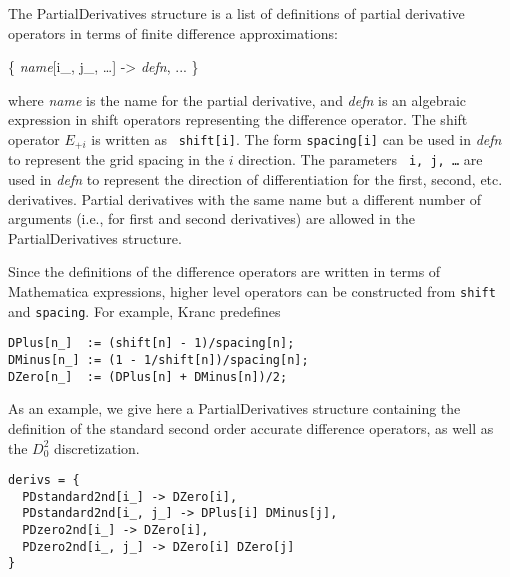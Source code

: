 \documentclass{report}
\begin{document}
The PartialDerivatives structure is a list of definitions of partial
derivative operators in terms of finite difference approximations:

\begin{center}
\begin{minipage}{0.8 \textwidth}
\begin{tt}
\{  {\it name}[i\_, j\_, \ldots] -> {\it defn}, ...  \}
\end{tt}
\end{minipage}
\end{center}

where {\it name} is the name for the partial derivative, and {\it
defn} is an algebraic expression in shift operators representing the
difference operator.  The shift operator $E_{+i}$ is written as {\tt
shift[i]}.  The form {\tt spacing[i]} can be used in {\it defn} to
represent the grid spacing in the $i$ direction.  The parameters {\tt
i, j, \ldots} are used in {\it defn} to represent the direction of
differentiation for the first, second, etc.  derivatives.  Partial
derivatives with the same name but a different number of arguments
(i.e., for first and second derivatives) are allowed in the
PartialDerivatives structure.

Since the definitions of the difference operators are written in terms
of Mathematica expressions, higher level operators can be constructed
from {\tt shift} and {\tt spacing}.  For example, Kranc predefines

\begin{center}
\begin{minipage}{0.8 \textwidth}
\begin{verbatim}
DPlus[n_]  := (shift[n] - 1)/spacing[n];
DMinus[n_] := (1 - 1/shift[n])/spacing[n];
DZero[n_]  := (DPlus[n] + DMinus[n])/2;
\end{verbatim}
\end{minipage}
\end{center}

As an example, we give here a PartialDerivatives structure containing
the definition of the standard second order accurate difference
operators, as well as the $D_0^2$ discretization.

\begin{center}
\begin{minipage}{0.8 \textwidth}
\begin{verbatim}
derivs = {
  PDstandard2nd[i_] -> DZero[i],
  PDstandard2nd[i_, j_] -> DPlus[i] DMinus[j],
  PDzero2nd[i_] -> DZero[i],
  PDzero2nd[i_, j_] -> DZero[i] DZero[j]
}
\end{verbatim}
\end{minipage}
\end{center}
\end{document}
